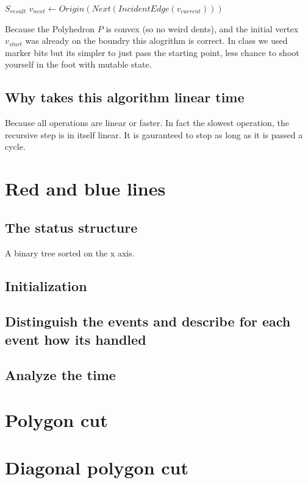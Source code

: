 \documentclass{article}
\begin{document}
\begin{empfile}
\begin{algorithmic}
		\State \Return $S_{result}$
	\EndIf
	\State
	$v_{next} \gets Origin(Next(IncidentEdge(v_{current})))$
	\State
	\Return {}
	\EndFunction
	\State \Return
	\EndFunction
	\State 
\end{algorithmic}

Because the Polyhedron $P$ is convex (so no weird dents), and
the initial vertex $v_{start}$ was already on the boundry this
alogrithm is correct.
In class we used marker bits but its simpler to just pass the
starting point, less chance to shoot yourself in the foot with
mutable state.

\subsection{Why takes this algorithm linear time}
Because all operations are linear or faster. In fact the slowest
operation, the recursive step is in itself linear. It is gauranteed to stop
as long as it is passed a cycle.

\section{Red and blue lines}
\subsection{The status structure}
A binary tree sorted on the x axis.
\subsection{Initialization}
\subsection{Distinguish the events and describe for each event how its handled}
\subsection{Analyze the time}
\section{Polygon cut}
\section{Diagonal polygon cut}
\end{empfile}
\end{document}
